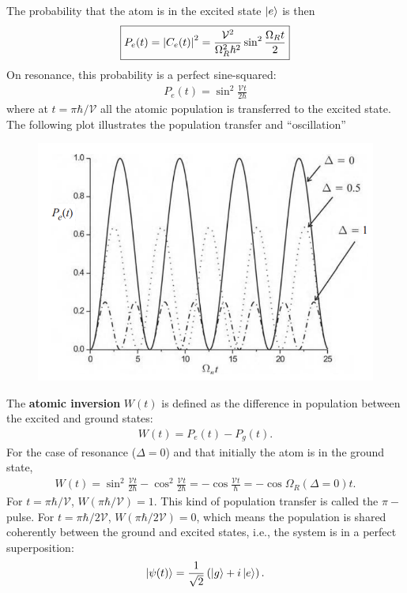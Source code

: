 \documentclass{book}
\theoremstyle{definition}
\newcommand{\f}[2]{\frac{#1}{#2}}
\newcommand{\lp}{\left(}
\newcommand{\rp}{\right)}
\begin{document}
The probability that the atom is in the excited state $\ket{e}$ is then
\begin{align}
\boxed{P_e(t) = \abs{C_e(t)}^2 = \f{\mathcal{V}^2}{\Omega_R^2\hbar^2}\sin^2\f{\Omega_R t}{2}}
\end{align}
On resonance, this probability is a perfect sine-squared:
\begin{align}
\boxed{P_e(t) = \sin^2\f{\mathcal{V}t}{2\hbar}}
\end{align}
where at $t= \pi \hbar / \mathcal{V}$ all the atomic population is transferred to the excited state. The following plot illustrates the population transfer and ``oscillation''
\begin{figure}[!htb]
	\centering
	\includegraphics[scale=0.3]{rabi}
\end{figure}

The \textbf{atomic inversion} $W(t)$ is defined as the difference in population between the excited and ground states:
\begin{align}
W(t) = P_e(t) - P_g(t).
\end{align}
For the case of resonance ($\Delta = 0$) and that initially the atom is in the ground state, 
\begin{align}
W(t) = \sin^2 \f{\mathcal{V}t}{2\hbar} - \cos^2 \f{\mathcal{V}t}{2\hbar} = -\cos\f{\mathcal{V}t}{\hbar} = -\cos\Omega_R(\Delta = 0)t.
\end{align}
For $t = \pi\hbar/\mathcal{V}$, $W(\pi\hbar/\mathcal{V}) = 1$. This kind of population transfer is called the $\pi-$pulse. For $t = \pi\hbar/2\mathcal{V}$, $W(\pi\hbar/2\mathcal{V}) = 0$, which means the population is shared coherently between the ground and excited states, i.e., the system is in a perfect superposition:
\begin{align}
\ket{\psi(t)} = \f{1}{\sqrt{2}}\lp\ket{g} + i\ket{e} \rp.
\end{align}
\end{document}
